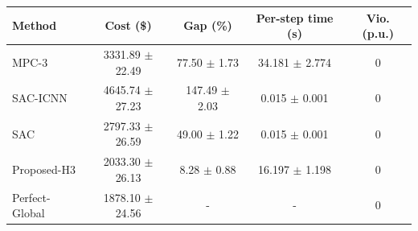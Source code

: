 \begin{tabular}{lcccc}
\toprule
Method & Cost (\$) & Gap (\%) & Per-step time (s) & Vio. (p.u.) \\
\midrule
MPC-3 & 3331.89 $\pm$ 22.49 & 77.50 $\pm$ 1.73 & 34.181 $\pm$ 2.774 & 0 \\
SAC-ICNN & 4645.74 $\pm$ 27.23 & 147.49 $\pm$ 2.03 & 0.015 $\pm$ 0.001 & 0 \\
SAC & 2797.33 $\pm$ 26.59 & 49.00 $\pm$ 1.22 & 0.015 $\pm$ 0.001 & 0 \\
Proposed-H3 & 2033.30 $\pm$ 26.13 & 8.28 $\pm$ 0.88 & 16.197 $\pm$ 1.198 & 0 \\
Perfect-Global & 1878.10 $\pm$ 24.56 & - & - & 0 \\
\bottomrule
\end{tabular}
